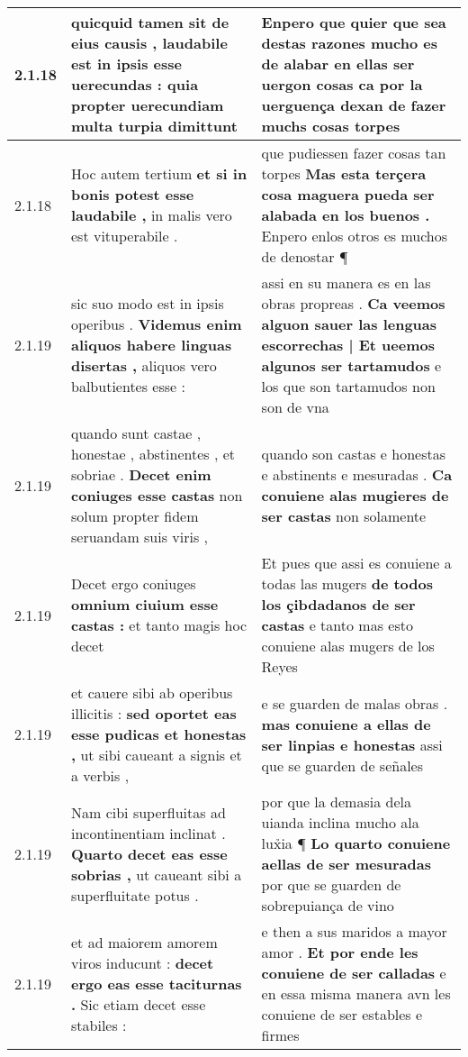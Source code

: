 \begin{tabular}{|p{1cm}|p{6.5cm}|p{6.5cm}|}
2.1.18 & quicquid tamen sit de eius causis , \textbf{ laudabile est in ipsis esse uerecundas : } quia propter uerecundiam multa turpia dimittunt & Enpero que quier que sea destas razones \textbf{ mucho es de alabar en ellas ser uergon cosas } ca por la uerguença dexan de fazer muchs cosas torpes \\\hline
2.1.18 & Hoc autem tertium \textbf{ et si in bonis potest esse laudabile , } in malis vero est vituperabile . & que pudiessen fazer cosas tan torpes \textbf{ Mas esta terçera cosa maguera pueda ser alabada en los buenos . } Enpero enlos otros es muchos de denostar ¶ \\\hline
2.1.19 & sic suo modo est in ipsis operibus . \textbf{ Videmus enim aliquos habere linguas disertas , } aliquos vero balbutientes esse : & assi en su manera es en las obras propreas . \textbf{ Ca veemos alguon sauer las lenguas escorrechas | Et ueemos algunos ser tartamudos } e los que son tartamudos non son de vna \\\hline
2.1.19 & quando sunt castae , honestae , abstinentes , et sobriae . \textbf{ Decet enim coniuges esse castas } non solum propter fidem seruandam suis viris , & quando son castas e honestas e abstinents e mesuradas . \textbf{ Ca conuiene alas mugieres de ser castas } non solamente \\\hline
2.1.19 & Decet ergo coniuges \textbf{ omnium ciuium esse castas : } et tanto magis hoc decet & Et pues que assi es conuiene a todas las mugers \textbf{ de todos los çibdadanos de ser castas } e tanto mas esto conuiene alas mugers de los Reyes \\\hline
2.1.19 & et cauere sibi ab operibus illicitis : \textbf{ sed oportet eas esse pudicas et honestas , } ut sibi caueant a signis et a verbis , & e se guarden de malas obras . \textbf{ mas conuiene a ellas de ser linpias e honestas } assi que se guarden de señales \\\hline
2.1.19 & Nam cibi superfluitas ad incontinentiam inclinat . \textbf{ Quarto decet eas esse sobrias , } ut caueant sibi a superfluitate potus . & por que la demasia dela uianda inclina mucho ala lux̉ia ¶ \textbf{ Lo quarto conuiene aellas de ser mesuradas } por que se guarden de sobrepuiança de vino \\\hline
2.1.19 & et ad maiorem amorem viros inducunt : \textbf{ decet ergo eas esse taciturnas . } Sic etiam decet esse stabiles : & e then a sus maridos a mayor amor . \textbf{ Et por ende les conuiene de ser calladas } e en essa misma manera avn les conuiene de ser estables e firmes \\\hline

\end{tabular}
